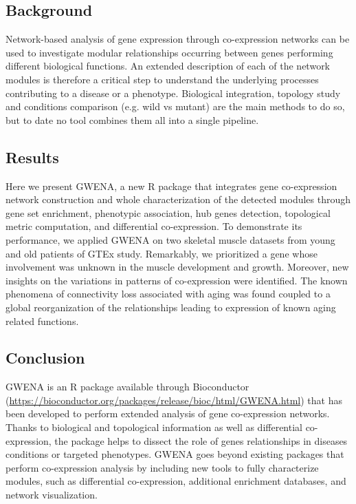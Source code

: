 \subsection{Background}
Network-based analysis of gene expression through co-expression networks can be used to investigate modular relationships occurring between genes performing different biological functions. An extended description of each of the network modules is therefore a critical step to understand the underlying processes contributing to a disease or a phenotype. Biological integration, topology study and conditions comparison (e.g. wild vs mutant) are the main methods to do so, but to date no tool combines them all into a single pipeline.

\subsection{Results}
Here we present GWENA, a new R package that integrates gene co-expression network construction and whole characterization of the detected modules through gene set enrichment, phenotypic association, hub genes detection, topological metric computation, and differential co-expression. To demonstrate its performance, we applied GWENA on two skeletal muscle datasets from young and old patients of GTEx study. Remarkably, we prioritized a gene whose involvement was unknown in the muscle development and growth. Moreover, new insights on the variations in patterns of co-expression were identified. The known phenomena of connectivity loss associated with aging was found coupled to a global reorganization of the relationships leading to expression of known aging related functions.

\subsection{Conclusion}
GWENA is an R package available through Bioconductor (\url{https://bioconductor.org/packages/release/bioc/html/GWENA.html}) that has been developed to perform extended analysis of gene co-expression networks. Thanks to biological and topological information as well as differential co-expression, the package helps to dissect the role of genes relationships in diseases conditions or targeted phenotypes. GWENA goes beyond existing packages that perform co-expression analysis by including new tools to fully characterize modules, such as differential co-expression, additional enrichment databases, and network visualization.

